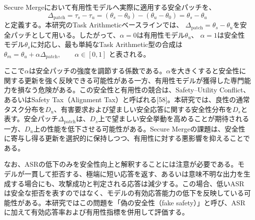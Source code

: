 \documentclass{article}
\begin{document}
Secure Mergeにおいて有用性モデルへ実際に適用する安全パッチを、
\[
\Delta_{\mathrm{patch}} = \tau_s - \tau_u = (\theta_s - \theta_0) - (\theta_u - \theta_0) = \theta_s-\theta_u
\]
と定義する。本研究のTask Arithmeticベースラインでは、 \(\Delta_{\mathrm{patch}}=\theta_s-\theta_u\)を安全パッチとして用いる。したがって、\(\alpha=0\)は有用性モデル\(\theta_u\)、 \(\alpha=1\)は安全性モデル\(\theta_s\)に対応し、最も単純なTask Arithmetic型の合成は \(\theta_m = \theta_u + \alpha \Delta_{\mathrm{patch}},\qquad \alpha \in [0,1]\) と表される。

ここで\(\alpha\)は安全パッチの強度を調節する係数である。\(\alpha\)を大きくすると安全性に関する更新を強く反映できる可能性がある一方、有用性モデルが獲得した専門能力を損なう危険がある。この安全性と有用性の競合は、Safety--Utility Conflict、あるいはSafety Tax（Alignment Tax）と呼ばれる[58]。本研究では、良性の通常タスク分布を\(D_u\)、有害要求および望ましい安全応答に関する安全性分布を\(D_s\)と表す。安全パッチ\(\Delta_{\mathrm{patch}}\)は、\(D_s\)上で望ましい安全挙動を高めることが期待される一方、\(D_u\)上の性能を低下させる可能性がある。Secure Mergeの課題は、安全性に寄与し得る更新を選択的に保持しつつ、有用性に対する悪影響を抑えることである。

なお、ASRの低下のみを安全性向上と解釈することには注意が必要である。モデルが一貫して拒否する、極端に短い応答を返す、あるいは意味不明な出力を生成する場合にも、攻撃成功と判定される応答は減少する。この場合、低いASRは安全な拒否を表すのではなく、モデルの有効応答能力の低下を反映している可能性がある。本研究ではこの問題を「偽の安全性（fake safety）」と呼び、ASRに加えて有効応答率および有用性指標を併用して評価する。
\end{document}
